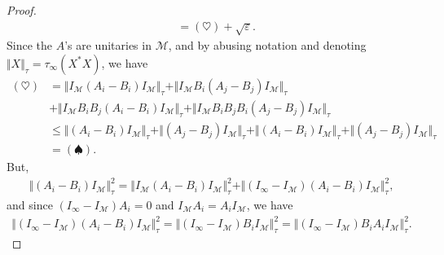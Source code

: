 \documentclass[11pt]{article}
\theoremstyle{definition}
\newcommand{\Id}{\ensuremath{I}}
\newcommand{\mM}{\ensuremath{\mathcal{M}}}
\newcommand{\eps}{\varepsilon}
\begin{document}
\begin{proof}
\begin{align*}
    &=(\heartsuit)+\sqrt\eps.
\end{align*}
Since the $A$'s are unitaries in $\mM$, and by abusing notation and denoting $\Vert X \Vert_\tau=\tau_\infty(X^*X)$, we have 
\begin{align*}
    (\heartsuit)&= \Vert \Id_\mM(A_i-B_i)\Id_\mM\Vert_\tau+\Vert \Id_\mM B_i(A_j-B_j)\Id_\mM\Vert_\tau\\
    &+\Vert \Id_\mM B_iB_j(A_i-B_i)\Id_\mM\Vert_\tau+\Vert \Id_\mM B_iB_jB_i(A_j-B_j)\Id_\mM\Vert_\tau\\
    &\leq \Vert (A_i-B_i)\Id_\mM\Vert_\tau+\Vert (A_j-B_j)\Id_\mM\Vert_\tau
    +\Vert (A_i-B_i)\Id_\mM\Vert_\tau+\Vert (A_j-B_j)\Id_\mM\Vert_\tau\\
    &=(\spadesuit).
\end{align*}
But,
\begin{align*}
     \Vert (A_i-B_i)\Id_\mM\Vert_\tau^2=  \Vert \Id_\mM(A_i-B_i)\Id_\mM\Vert_\tau^2+\Vert (\Id_\infty-\Id_\mM)(A_i-B_i)\Id_\mM\Vert_\tau^2,
\end{align*}
and since $(\Id_\infty -\Id_\mM)A_i=0$ and $\Id_\mM A_i=A_i\Id_\mM$, we have
\begin{align*}
    \Vert (\Id_\infty-\Id_\mM)(A_i-B_i)\Id_\mM\Vert_\tau^2= \Vert (\Id_\infty-\Id_\mM)B_i\Id_\mM\Vert_\tau^2=\Vert (\Id_\infty-\Id_\mM)B_iA_i\Id_\mM\Vert_\tau^2.
\end{align*}

\end{proof}
\end{document}
